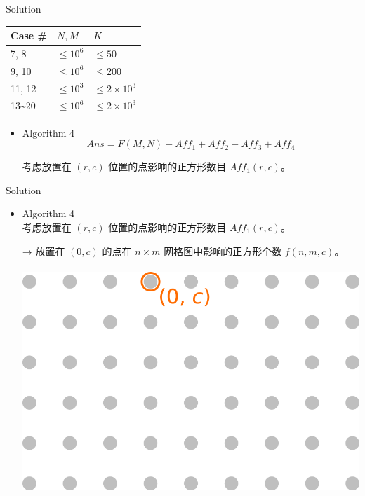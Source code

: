 \documentclass[UTF8]{beamer}
\begin{document}
\begin{frame}{Solution}

\begin{tabularx}{\textwidth}{X|X|X} \hline
Case \# & $N, M$ & $K$ \\ \hline \hline
7, 8   & $\leq 10^6$ & $\leq 50$            \\ \hline
9, 10  & $\leq 10^6$ & $\leq 200$           \\ \hline
11, 12 & $\leq 10^3$ & $\leq 2 \times 10^3$ \\ \hline
13\textasciitilde 20 & $\leq 10^6$ & $\leq 2 \times 10^3$ \\ \hline
\end{tabularx}
\begin{itemize}
    \item Algorithm 4 \\
        $$
            Ans = F(M, N) - Aff_1 + Aff_2 - Aff_3 + Aff_4
        $$

        \pause
        考虑放置在 $(r, c)$ 位置的点影响的正方形数目 $Aff_1(r, c)$。
\end{itemize}

\end{frame}

\begin{frame}{Solution}

\begin{itemize}
    \item Algorithm 4 \\
        考虑放置在 $(r, c)$ 位置的点影响的正方形数目 $Aff_1(r, c)$。

        \pause
        → 放置在 $(0, c)$ 的点在 $n \times m$ 网格图中影响的正方形个数 $f(n, m, c)$。\\　\\

        \includegraphics[scale=0.8]{square-f.png}
\end{itemize}

\end{frame}
\end{document}
